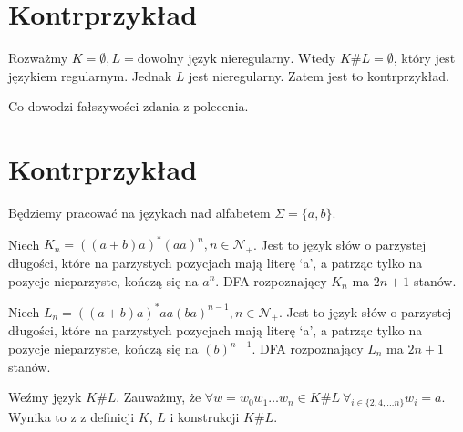 \documentclass{article}
\theoremstyle{definition}
\theoremstyle{remark}
\begin{document}
\section{Kontrprzykład}

Rozważmy \(K = \emptyset, L = \text{dowolny język nieregularny}\). Wtedy \(K \#
L = \emptyset\), który jest językiem regularnym. Jednak \(L\) jest
nieregularny. Zatem jest to kontrprzykład.

Co dowodzi fałszywości zdania z polecenia.

\section{Kontrprzykład}

Będziemy pracować na językach nad alfabetem \(\Sigma = \{a, b\}\).

Niech \(K_n = ( (a+b)a )^* (aa)^n, n \in \mathcal{N_+}\). Jest to język słów o
parzystej długości, które na parzystych pozycjach mają literę `a', a patrząc
tylko na pozycje nieparzyste, kończą się na \(a^n\). DFA rozpoznający \(K_n\)
ma \(2n+1\) stanów.

 \begin{center}
 \end{center}

Niech \(L_n = ( (a+b)a )^* aa (ba)^{n-1}, n \in \mathcal{N_+}\). Jest to język
słów o parzystej długości, które na parzystych pozycjach mają literę `a', a
patrząc tylko na pozycje nieparzyste, kończą się na \( (b)^{n-1}\). DFA
rozpoznający \(L_n\) ma \(2n+1\) stanów.

Weźmy język \(K \# L\). Zauważmy, że \( \forall w= w_0 w_1 \ldots w_n \in K \#
L \ \forall_{i \in \{ 2, 4, \ldots n \} } w_i = a\). Wynika to z z definicji
\(K\), \(L\) i konstrukcji \(K \# L\).
\end{document}
